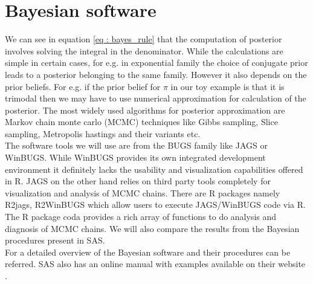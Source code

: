 \section{Bayesian software}
We can see in equation \ref{eq : bayes_rule} that the computation of posterior involves solving the integral in the denominator. While the calculations are simple in certain cases, for e.g. in exponential family the choice of conjugate prior leads to a posterior belonging to the same family. However it also depends on the prior beliefs. For e.g. if the prior belief for $\pi$ in our toy example is that it is trimodal then we may have to use numerical approximation for calculation of the posterior. The most widely used algorithms for posterior approximation are Markov chain monte carlo (MCMC) techniques like Gibbs sampling, Slice sampling, Metropolis hastings and their variants etc.\\

The software tools we will use are from the BUGS family like JAGS or WinBUGS. While WinBUGS provides its own integrated development environment it definitely lacks the usability and visualization capabilities offered in R. JAGS on the other hand relies on third party tools completely for visualization and analysis of MCMC chains. There are R packages namely R2jags, R2WinBUGS which allow users to execute JAGS/WinBUGS code via R. The R package coda provides a rich array of functions to do analysis and diagnosis of MCMC chains. We will also compare the results from the Bayesian procedures present in SAS.\\

For a detailed overview of the Bayesian software and their procedures \citet[Chap. 8]{lesaffre_bayesian_2012} can be referred. SAS also has an online manual with examples available on their website \citet{_bayesian_????}.